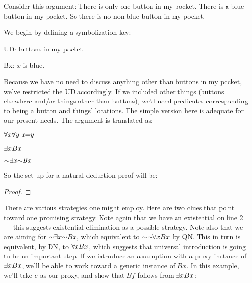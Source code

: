 Consider this argument: There is only one button in my pocket. There is a blue button in my pocket. So there is no non-blue button in my pocket.

We begin by defining a symbolization key:
\begin{ekey}
\item{UD:} buttons in my pocket
\item{Bx:} $x$ is blue.
\end{ekey}
Because we have no need to discuss anything other than buttons in my pocket, we've restricted the UD accordingly. If we included other things (buttons elsewhere and/or things other than buttons), we'd need predicates corresponding to being a button and things' locations. The simple version here is adequate for our present needs. The argument is translated as:
\begin{earg}
\item{} $\qt{\forall}{x} \qt{\forall}{y}\ x{=}y$
\item{} $\exists x Bx$
\item{\therefore} $\enot \qt{\exists}{x} \enot Bx$
\end{earg}

So the set-up for a natural deduction proof will be:

\begin{proof}
	 \pr{}
	 
	\have{}{}{}
\end{proof}

There are various strategies one might employ. Here are two clues that point toward one promising strategy. Note again that we have an existential on line 2 --- this suggests existential elimination as a possible strategy. Note also that we are aiming for $\enot \qt{\exists}{x} \enot Bx$, which equivalent to $\enot \enot \qt{\forall}{x} Bx$ by QN. This in turn is equivalent, by DN, to $\forall x Bx$, which suggests that universal introduction is going to be an important step. If we introduce an assumption with a proxy instance of $\exists x Bx$, we'll be able to work toward a generic instance of $Bx$. In this example, we'll take $e$ as our proxy, and show that $Bf$ follows from $\exists x Bx$:

